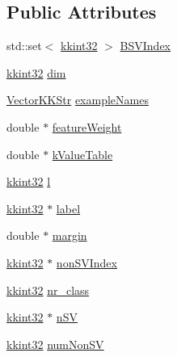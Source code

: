 \subsection*{Public Attributes}
\begin{DoxyCompactItemize}
\item 
std\+::set$<$ \hyperlink{namespace_k_k_b_a8fa4952cc84fda1de4bec1fbdd8d5b1b}{kkint32} $>$ \hyperlink{struct_s_v_m233_1_1_svm_model233_a372161aff471166f8f683ae7a948ce58}{B\+S\+V\+Index}
\item 
\hyperlink{namespace_k_k_b_a8fa4952cc84fda1de4bec1fbdd8d5b1b}{kkint32} \hyperlink{struct_s_v_m233_1_1_svm_model233_ad0681f24a20ff15423eb9b3b0d24c1c6}{dim}
\item 
\hyperlink{class_k_k_b_1_1_vector_k_k_str}{Vector\+K\+K\+Str} \hyperlink{struct_s_v_m233_1_1_svm_model233_afa332c55cdafdab8746f38c85fb22741}{example\+Names}
\item 
double $\ast$ \hyperlink{struct_s_v_m233_1_1_svm_model233_a2b8ac0c5640a5a57b77561122c2f0fea}{feature\+Weight}
\item 
double $\ast$ \hyperlink{struct_s_v_m233_1_1_svm_model233_a2ab40b5375c760b5a71fa646f1390040}{k\+Value\+Table}
\item 
\hyperlink{namespace_k_k_b_a8fa4952cc84fda1de4bec1fbdd8d5b1b}{kkint32} \hyperlink{struct_s_v_m233_1_1_svm_model233_ae37947940a05ecebb1352b6f365b4050}{l}
\item 
\hyperlink{namespace_k_k_b_a8fa4952cc84fda1de4bec1fbdd8d5b1b}{kkint32} $\ast$ \hyperlink{struct_s_v_m233_1_1_svm_model233_a36d0c9e4a7019a0de64fc8661cc10bf3}{label}
\item 
double $\ast$ \hyperlink{struct_s_v_m233_1_1_svm_model233_a6a178965d1c6ebccdf51af3fc7486d46}{margin}
\item 
\hyperlink{namespace_k_k_b_a8fa4952cc84fda1de4bec1fbdd8d5b1b}{kkint32} $\ast$ \hyperlink{struct_s_v_m233_1_1_svm_model233_a4dad3a53f8d437a2f6964fd350910210}{non\+S\+V\+Index}
\item 
\hyperlink{namespace_k_k_b_a8fa4952cc84fda1de4bec1fbdd8d5b1b}{kkint32} \hyperlink{struct_s_v_m233_1_1_svm_model233_a55a9d2b4d87f50f14dfdcc1afc65b47b}{nr\+\_\+class}
\item 
\hyperlink{namespace_k_k_b_a8fa4952cc84fda1de4bec1fbdd8d5b1b}{kkint32} $\ast$ \hyperlink{struct_s_v_m233_1_1_svm_model233_a4f2e1cae54d713246c1c7b63a5b30136}{n\+SV}
\item 
\hyperlink{namespace_k_k_b_a8fa4952cc84fda1de4bec1fbdd8d5b1b}{kkint32} \hyperlink{struct_s_v_m233_1_1_svm_model233_ac47eca978ebd760afbb5a2e72bfff274}{num\+Non\+SV}

\end{DoxyCompactItemize}
